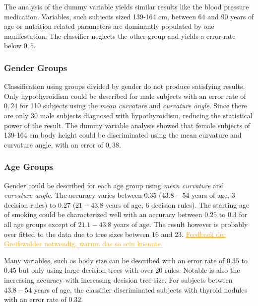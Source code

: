 \documentclass[a4paper,twoside]{style/article}
\newcommand{\com}[1]{\textcolor{orange}{\uline{#1}}}
\begin{document}
The analysis of the dummy variable yields similar results like the blood pressure medication.
Variables, such subjects sized 139-164 cm, between 64 and 90 years of age or nutrition related parameters are dominantly populated by one manifestation.
The classifier neglects the other group and yields a error rate below $0,5$.
\subsubsection{Gender Groups}
Classification using groups divided by gender do not produce satisfying results.
Only hypothyroidism could be described for male subjects with an error rate of $0,24$ for 110 subjects using the \emph{mean curvature} and \emph{curvature angle}.
Since there are only 30 male subjects diagnosed with hypothyroidism, reducing the statistical power of the result.
The dummy variable analysis showed that female subjects of 139-164 cm body height could be discriminated using the mean curvature and curvature angle, with an error of $0,38$.

\subsubsection{Age Groups}
Gender could be described for each age group using \emph{mean curvature} and \emph{curvature angle}.
The accuracy varies between $0.35$ ($43.8-54$ years of age, 3 decision rules) to $0.27$ ($21-43.8$ years of age, 6 decision rules).
The starting age of smoking could be characterized well with an accuracy between $0.25$ to $0.3$ for all age groups except of $21.1-43.8$ years of age.
The result however is probably over fitted to the data due to tree sizes between $16$ and $23$.
\com{Feedback der Greifswalder notwendig, warum das so sein koennte.}

Many variables, such as body size can be described with an error rate of $0.35$ to $0.45$ but only using large decision trees with over 20 rules.
Notable is also the increasing accuracy with increasing decision tree size.
For subjects between $43.8-54$ years of age, the classifier discriminated subjects with thyroid nodules with an error rate of $0.32$.
\end{document}
